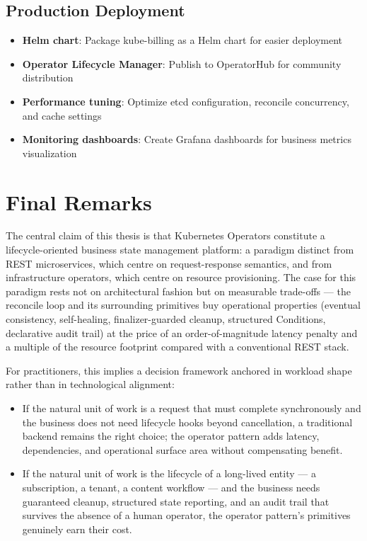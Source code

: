 \subsection{Production Deployment}

\begin{itemize}
    \item \textbf{Helm chart}: Package kube-billing as a Helm chart for easier deployment
    
    \item \textbf{Operator Lifecycle Manager}: Publish to OperatorHub for community distribution
    
    \item \textbf{Performance tuning}: Optimize etcd configuration, reconcile concurrency, and cache settings
    
    \item \textbf{Monitoring dashboards}: Create Grafana dashboards for business metrics visualization
\end{itemize}

\section{Final Remarks}

The central claim of this thesis is that Kubernetes Operators constitute a lifecycle-oriented business state management platform: a paradigm distinct from REST microservices, which centre on request-response semantics, and from infrastructure operators, which centre on resource provisioning. The case for this paradigm rests not on architectural fashion but on measurable trade-offs --- the reconcile loop and its surrounding primitives buy operational properties (eventual consistency, self-healing, finalizer-guarded cleanup, structured Conditions, declarative audit trail) at the price of an order-of-magnitude latency penalty and a multiple of the resource footprint compared with a conventional REST stack.

For practitioners, this implies a decision framework anchored in workload shape rather than in technological alignment:

\begin{itemize}
    \item If the natural unit of work is a request that must complete synchronously and the business does not need lifecycle hooks beyond cancellation, a traditional backend remains the right choice; the operator pattern adds latency, dependencies, and operational surface area without compensating benefit.
    \item If the natural unit of work is the lifecycle of a long-lived entity --- a subscription, a tenant, a content workflow --- and the business needs guaranteed cleanup, structured state reporting, and an audit trail that survives the absence of a human operator, the operator pattern's primitives genuinely earn their cost.
\end{itemize}

